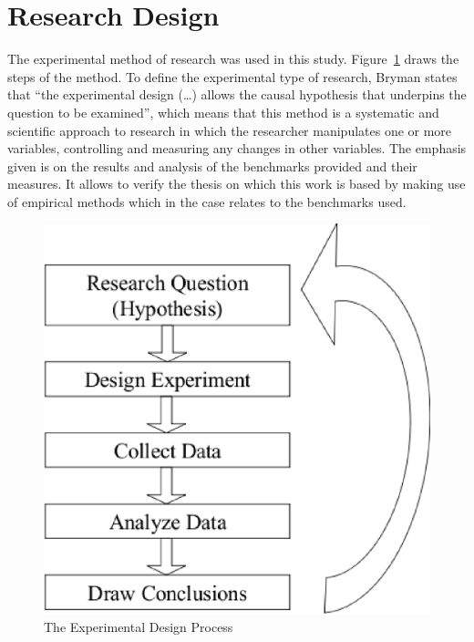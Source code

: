 \section{Research Design} \label{sec3:research_design} 
    The experimental method of research was used in this study. Figure~\ref{fig:experimental_method_approach} draws the steps of the method. To define the experimental type of research, Bryman \cite{bryman89} states that ``the experimental design (\ldots) allows the causal hypothesis that underpins the question to be examined'', which means that this method is a systematic and scientific approach to research in which the researcher manipulates one or more variables, controlling and measuring any changes in other variables. The emphasis given is on the results and analysis of the benchmarks provided and their measures. It allows to verify the thesis on which this work is based by making use of empirical methods which in the case relates to the benchmarks used.
    \begin{figure}[htbp]
        \centering
            \includegraphics[scale=0.5]{graphics/experimental_method_approach}
            \caption{The Experimental Design Process}
            \label{fig:experimental_method_approach}
    \end{figure}

